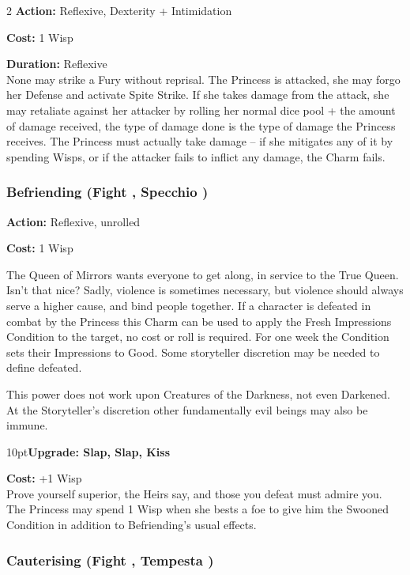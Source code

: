 \begin{multicols}{2}
\noindent \textbf{Action:} Reflexive, Dexterity + Intimidation

\noindent \textbf{Cost:} 1 Wisp

\noindent \textbf{Duration:} Reflexive\\

\noindent None may strike a Fury without reprisal. The Princess is attacked, she may forgo her Defense and activate Spite Strike. If she takes damage from the attack, she may retaliate against her attacker by rolling her normal dice pool + the amount of damage received, the type of damage done is the type of damage the Princess receives. The Princess must actually take damage -- if she mitigates any of it by spending Wisps, or if the attacker fails to inflict any damage, the Charm fails.

\subsubsection*{Befriending (Fight \textbullet\textbullet, Specchio \textbullet\textbullet)}

\noindent \textbf{Action:} Reflexive, unrolled

\noindent \textbf{Cost:} 1 Wisp

\noindent The Queen of Mirrors wants everyone to get along, in service to the True Queen. Isn't that nice? Sadly, violence is sometimes necessary, but violence should always serve a higher cause, and bind people together. If a character is defeated in combat by the Princess this Charm can be used to apply the Fresh Impressions Condition to the target, no cost or roll is required. For one week the Condition sets their Impressions to Good. Some storyteller discretion may be needed to define defeated.

This power does not work upon Creatures of the Darkness, not even Darkened. At the Storyteller's discretion other fundamentally evil beings may also be immune. 

\begin{myindentpar}{10pt}\textbf{Upgrade: Slap, Slap, Kiss}

\textbf{Cost:} +1 Wisp\\

\noindent Prove yourself superior, the Heirs say, and those you defeat must admire you. The Princess may spend 1 Wisp when she bests a foe to give him the Swooned Condition in addition to Befriending's usual effects. \end{myindentpar}

\subsubsection*{Cauterising (Fight \textbullet\textbullet, Tempesta \textbullet\textbullet\textbullet)}


\end{multicols}
